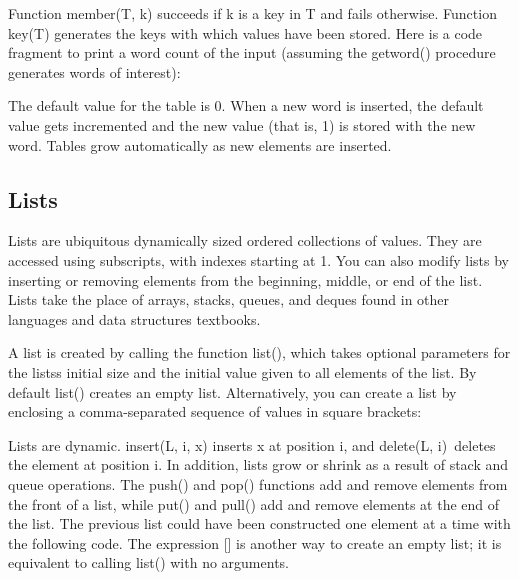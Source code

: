 Function \textsf{member(T, k)} succeeds if
\textsf{k} is a key in \textsf{T} and fails otherwise. Function
\textsf{key(T)} generates the keys with which values
have been stored. Here is a code fragment to print a word count of the
input (assuming the \textsf{getword()} procedure generates words of
interest): 


The default value for the table is 0. When a new word is inserted, the
default value gets incremented and the new value (that is, 1) is stored
with the new word. Tables grow automatically as new elements are
inserted.

\subsection[Lists]{Lists}

Lists are ubiquitous dynamically sized ordered
collections of values. They are accessed using subscripts, with indexes
starting at 1. You can also modify lists by inserting or removing
elements from the beginning, middle, or end of the list. Lists take the
place of arrays, stacks, queues,
and deques found in other languages and data structures
textbooks.

A list is created by calling the function \textsf{list()},
which takes optional parameters for the lists{\textquotesingle}s
initial size and the initial value given to all elements of the list.
By default \textsf{list()} creates an empty list. Alternatively, you
can create a list by enclosing a comma-separated sequence of values in
square brackets: 


Lists are dynamic. \textsf{insert(L, i, x)} inserts
\textsf{x} at position \textsf{i}, and
\textsf{delete(L, i)}\texttt{ }deletes the element
at position \textsf{i}. In addition, lists grow or shrink as a result
of stack and queue operations. The \textsf{push()} and
\textsf{pop()} functions add and remove elements from the
front of a list, while \textsf{put()} and
\textsf{pull()} add and remove elements at the end of
the list. The previous list could have been constructed one element at
a time with the following code. The expression \textsf{[]} is another
way to create an empty list; it is equivalent to
calling \textsf{list()} with no arguments.

